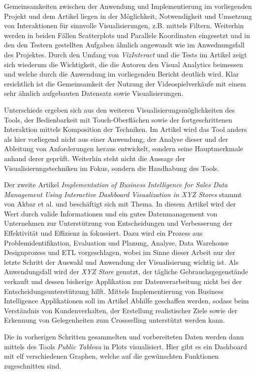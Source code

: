 \documentclass[usegeometry=true]{scrartcl}
\begin{document}
Gemeinsamkeiten zwischen der Anwendung und Implementierung im vorliegenden Projekt und dem Artikel liegen in der Möglichkeit, Notwendigkeit  und Umsetzung von Interaktionen für sinnvolle Visualisierungen, z.B. mittels Filtern.
Weiterhin werden in beiden Fällen Scatterplots und Parallele Koordinaten eingesetzt und in den den Testern gestellten Aufgaben ähnlich angewandt wie im Anwednungsfall des Projektes. 
Durch den Umfang von \textit{VizInteract} und die Tests im Artikel zeigt sich wiederum die Wichtigkeit, die die Autoren den Visual Analytics beimessen und welche durch die Anwendung im vorliegenden Bericht deutlich wird.
Klar ersichtlich ist die Gemeinsamkeit der Nutzung der Videospielverkäufe mit einem sehr ähnlich aufgebauten Datensatz sowie Visualisierungen.

Unterschiede ergeben sich aus den weiteren Visualisierungsmöglichkeiten des Tools, der Bedienbarkeit mit Touch-Oberflächen sowie der fortgeschrittenen Interaktion mittels Komposition der Techniken. 
Im Artikel wird das Tool anders als hier vorliegend nicht aus einer Anwendung, der Analyse dieser und der Ableitung von Anforderungen heraus entwickelt, sondern seine Hauptmerkmale anhand derer geprüft.
Weiterhin steht nicht die Aussage der Visualisierungstechniken im Fokus, sondern die Handhabung des Tools. 

Der zweite Artikel \textit{Implementation of Business Intelligence for Sales Data Management Using Interactive Dashboard Visualization in XYZ Stores} stammt von Akbar et al. und beschäftigt sich mit Thema.\cite{.}
In diesem Artikel wird der Wert durch valide Informationen und ein gutes Datenmanagement von Unternehmen zur Unterstützung von Entscheidungen und Verbesserung der Effektivität und Effizienz in fokussiert.
Dazu wird ein Prozess aus Problemidentifikation, Evaluation und Planung, Analyse, Data Warehouse Designprozess und ETL vorgeschlagen, wobei im Sinne dieser Arbeit nur der letzte Schritt der Auswahl und Anwendung der Visualisierung wichtig ist. 
Als Anwendungsfall wird der \textit{XYZ Store} genutzt, der tägliche Gebrauchsgegenstände verkauft und dessen bisherige Applikation zur Datenverarbeitung nicht bei der Entscheidungsunterstützung hilft.
Mittels Implementierung von Business Intelligence Applikationen soll im Artikel Abhilfe geschaffen werden, sodass beim Verständnis von Kundenverhalten, der Erstellung realistischer Ziele sowie der Erkennung von Gelegenheiten zum Crossselling unterstützt werden kann.

Die in vorherigen Schritten gesammelten und vorbereiteten Daten werden dann mittels des Tools \textit{Public Tableau} in Plots visualisiert.
Hier gibt es ein Dashboard mit elf verschiedenen Graphen, welche auf die gewünschten Funktionen zugeschnitten sind. 
\end{document}
